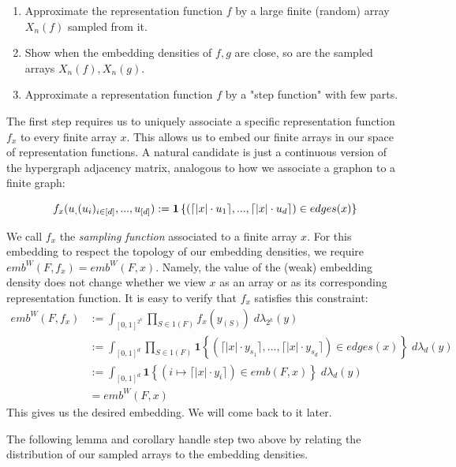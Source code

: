 \documentclass[11pt,oneside,reqno]{article}
\theoremstyle{plain}
\theoremstyle{definition}
\numberwithin{equation}{section}
\newcommand{\ind}{\mathbf{1}}
\begin{document}
\begin{enumerate}
    \item Approximate the representation function $f$ by a large finite (random) array $X_n(f)$ sampled from it.

    \item Show when the embedding densities of $f,g$ are close, so are the sampled arrays $X_n(f), X_n(g)$. 

    \item Approximate a representation function $f$ by a "step function" with few parts.
\end{enumerate}

\noindent The first step requires us to uniquely associate a specific representation function $f_x$ to every finite array $x$. This allows us to embed our finite arrays in our space of representation functions. A natural candidate is just a continuous version of the hypergraph adjacency matrix, analogous to how we associate a graphon to a finite graph:

\[f_x(u_\empty, (u_i)_{i \in [d]}, ..., u_{[d]}) := \ind \left\{(\lceil |x| \cdot u_1 \rceil,..., \lceil |x| \cdot u_d \rceil) \in edges(x) \right\}\]

\noindent We call $f_x$ the \textit{sampling function} associated to a finite array $x$. For this embedding to respect the topology of our embedding densities, we require $emb^W(F, f_x) = emb^W(F, x)$. Namely, the value of the (weak) embedding density does not change whether we view $x$ as an array or as its corresponding representation function. It is easy to verify that $f_x$ satisfies this constraint:
%
\begin{align*}
    emb^W(F, f_x) & := \int_{[0,1]^{2^k}} \prod_{S \in 1(F)} f_x(y_{(S)}) \; d\lambda_{2^k}(y) \\
    & := \int_{[0,1]^{d}} \prod_{S \in 1(F)} \ind \left\{(\lceil |x| \cdot y_{s_1} \rceil,..., \lceil |x| \cdot y_{s_d} \rceil) \in edges(x) \right\} \; d\lambda_{d}(y) \\
    & := \int_{[0,1]^{d}}  \ind \left\{ (i \mapsto \lceil |x| \cdot y_i \rceil)  \in emb(F,x)  \right\} \; d\lambda_{d}(y) \\[5pt]
    & = emb^W(F,x) 
\end{align*}
%
This gives us the desired embedding. We will come back to it later. 

The following lemma and corollary handle step two above by relating the distribution of our sampled arrays to the embedding densities.
\end{document}

